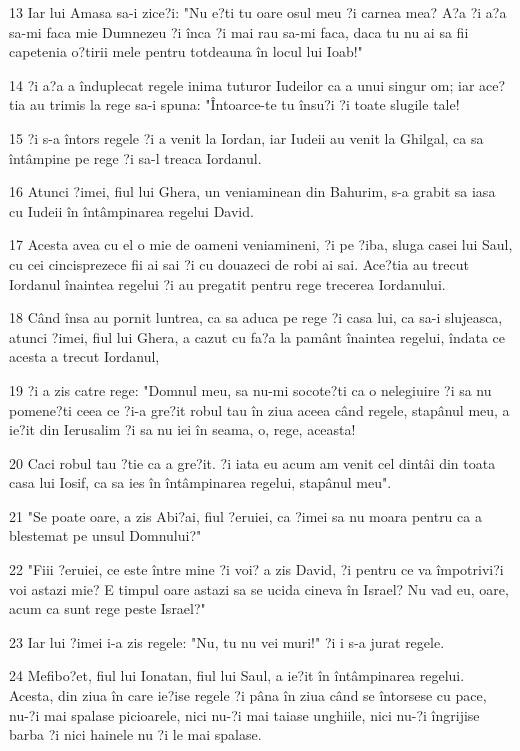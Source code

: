\par 13 Iar lui Amasa sa-i zice?i: "Nu e?ti tu oare osul meu ?i carnea mea? A?a ?i a?a sa-mi faca mie Dumnezeu ?i înca ?i mai rau sa-mi faca, daca tu nu ai sa fii capetenia o?tirii mele pentru totdeauna în locul lui Ioab!"
\par 14 ?i a?a a înduplecat regele inima tuturor Iudeilor ca a unui singur om; iar ace?tia au trimis la rege sa-i spuna: "Întoarce-te tu însu?i ?i toate slugile tale!
\par 15 ?i s-a întors regele ?i a venit la Iordan, iar Iudeii au venit la Ghilgal, ca sa întâmpine pe rege ?i sa-l treaca Iordanul.
\par 16 Atunci ?imei, fiul lui Ghera, un veniaminean din Bahurim, s-a grabit sa iasa cu Iudeii în întâmpinarea regelui David.
\par 17 Acesta avea cu el o mie de oameni veniamineni, ?i pe ?iba, sluga casei lui Saul, cu cei cincisprezece fii ai sai ?i cu douazeci de robi ai sai. Ace?tia au trecut Iordanul înaintea regelui ?i au pregatit pentru rege trecerea Iordanului.
\par 18 Când însa au pornit luntrea, ca sa aduca pe rege ?i casa lui, ca sa-i slujeasca, atunci ?imei, fiul lui Ghera, a cazut cu fa?a la pamânt înaintea regelui, îndata ce acesta a trecut Iordanul,
\par 19 ?i a zis catre rege: "Domnul meu, sa nu-mi socote?ti ca o nelegiuire ?i sa nu pomene?ti ceea ce ?i-a gre?it robul tau în ziua aceea când regele, stapânul meu, a ie?it din Ierusalim ?i sa nu iei în seama, o, rege, aceasta!
\par 20 Caci robul tau ?tie ca a gre?it. ?i iata eu acum am venit cel dintâi din toata casa lui Iosif, ca sa ies în întâmpinarea regelui, stapânul meu".
\par 21 "Se poate oare, a zis Abi?ai, fiul ?eruiei, ca ?imei sa nu moara pentru ca a blestemat pe unsul Domnului?"
\par 22 "Fiii ?eruiei, ce este între mine ?i voi? a zis David, ?i pentru ce va împotrivi?i voi astazi mie? E timpul oare astazi sa se ucida cineva în Israel? Nu vad eu, oare, acum ca sunt rege peste Israel?"
\par 23 Iar lui ?imei i-a zis regele: "Nu, tu nu vei muri!" ?i i s-a jurat regele.
\par 24 Mefibo?et, fiul lui Ionatan, fiul lui Saul, a ie?it în întâmpinarea regelui. Acesta, din ziua în care ie?ise regele ?i pâna în ziua când se întorsese cu pace, nu-?i mai spalase picioarele, nici nu-?i mai taiase unghiile, nici nu-?i îngrijise barba ?i nici hainele nu ?i le mai spalase.
